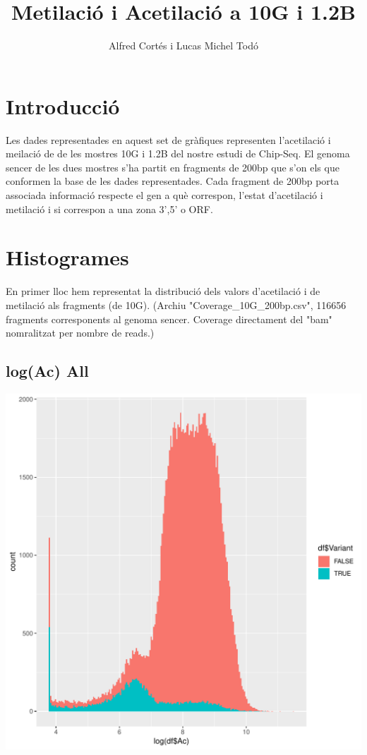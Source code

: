 \documentclass{article}\usepackage[]{graphicx}\usepackage[]{color}
\newenvironment{knitrout}{}{} %
\begin{document}
\title{Metilació i Acetilació a 10G i 1.2B}
\author{Alfred Cortés i Lucas Michel Todó}
\maketitle
\tableofcontents
\clearpage
\section{Introducció}
Les dades representades en aquest set de gràfiques representen l'acetilació i meilació de de les mostres 10G i 1.2B del nostre estudi de Chip-Seq. El genoma sencer de les dues mostres s'ha partit en fragments de 200bp que s'on els que conformen la base de les dades representades. Cada fragment de 200bp porta associada informació respecte el gen a què correspon, l'estat d'acetilació i metilació i si correspon a una zona 3',5' o ORF. 
\clearpage








\section{Histogrames}
En primer lloc hem representat la distribució dels valors d'acetilació i de metilació als fragments (de 10G). (Archiu "Coverage\_10G\_200bp.csv", 116656 fragments corresponents al genoma sencer. Coverage directament del "bam" nomralitzat per nombre de reads.)
\subsection{log(Ac) All}
\begin{knitrout}
\color{fgcolor}

{\centering \includegraphics[width=1\linewidth]{figure/minimal-dens_all-1} 

}



\end{knitrout}
\clearpage
\end{document}

